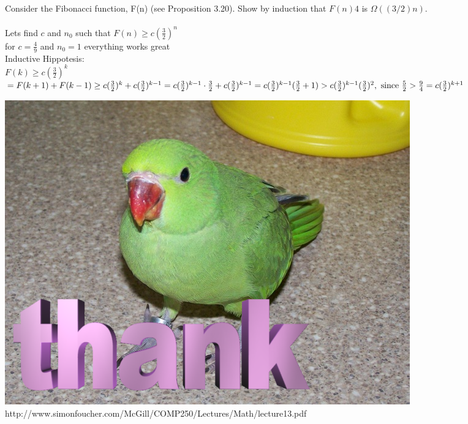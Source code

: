 \documentclass{article}
\begin{document}
Consider the Fibonacci function, F(n) (see Proposition 3.20). Show by
induction that $F(n)4$ is $\Omega((3/2)n)$.\\\\

Lets find $c$ and $n_{0}$ such that $F(n) \geq c(\frac{3}{2})^{n}$\\
for $c = \frac{4}{9}$ and $n_{0} = 1$ everything works great\\
Inductive Hippotesis:\\
$F(k) \geq c(\frac{3}{2})^{k}$\\
\begin{math}
= F(k+1) + F(k-1)\\
\geq c(\frac{3}{2})^{k} + c(\frac{3}{2})^{k-1}\\
= c(\frac{3}{2})^{k-1}\cdot\frac{3}{2} + c(\frac{3}{2})^{k-1}\\
= c(\frac{3}{2})^{k-1}(\frac{3}{2}+1)\\
> c(\frac{3}{2})^{k-1}(\frac{3}{2})^{2}, \textnormal{ since } \frac{5}{2} > \frac{9}{4} \\
= c(\frac{3}{2})^{k+1}
\end{math}


\begin{center}
	\includegraphics[scale=0.3]{birb}
	http://www.simonfoucher.com/McGill/COMP250/Lectures/Math/lecture13.pdf
\end{center}

	
\end{document}
